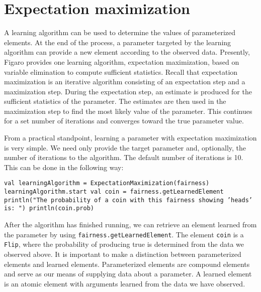 \section{Expectation maximization}

A learning algorithm can be used to determine the values of parameterized elements. At the end of the process, a parameter targeted by the learning algorithm can provide a new element according to the observed data. Presently, Figaro provides one learning algorithm, expectation maximization, based on variable elimination to compute sufficient statistics. Recall that expectation maximization is an iterative algorithm consisting of an expectation step and a maximization step. During the expectation step, an estimate is produced for the sufficient statistics of the parameter. The estimates are then used in the maximization step to find the most likely value of the parameter. This continues for a set number of iterations and converges toward the true parameter value.

From a practical standpoint, learning a parameter with expectation maximization is very simple. We need only provide the target parameter and, optionally, the number of iterations to the algorithm. The default number of iterations is 10. This can be done in the following way:

\begin{flushleft}
\texttt{val learningAlgorithm = ExpectationMaximization(fairness)
\newline learningAlgorithm.start
\newline 
\newline val coin = fairness.getLearnedElement
\newline println("The probability of a coin with this fairness showing
'heads' is: ")
\newline println(coin.prob)
}
\end{flushleft}

After the algorithm has finished running, we can retrieve an element learned from the parameter by using \texttt{fairness.getLearnedEle\-ment}. The element \texttt{coin} is a \texttt{Flip}, where the probability of producing true is determined from the data we observed above. It is important to make a distinction between parameterized elements and learned elements. Parameterized elements are compound elements and serve as our means of supplying data about a parameter. A learned element is an atomic element with arguments learned from the data we have observed.

